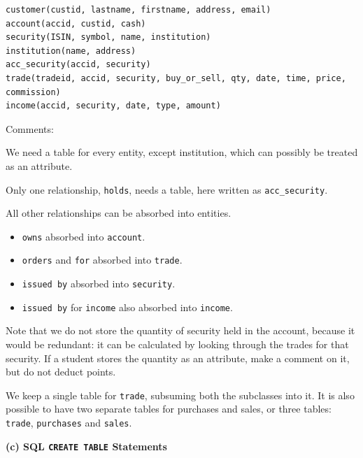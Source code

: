 \begin{verbatim}
customer(custid, lastname, firstname, address, email)
account(accid, custid, cash)
security(ISIN, symbol, name, institution)
institution(name, address)
acc_security(accid, security)
trade(tradeid, accid, security, buy_or_sell, qty, date, time, price, commission)
income(accid, security, date, type, amount)
\end{verbatim}

Comments:

We need a table for every entity, except institution, which can possibly be treated as an attribute.

Only one relationship, \texttt{holds}, needs a table, here written as \texttt{acc\_security}.

All other relationships can be absorbed into entities.
\begin{itemize}
  \item \texttt{owns} absorbed into \texttt{account}.
  \item \texttt{orders} and \texttt{for} absorbed into \texttt{trade}.
  \item \texttt{issued by} absorbed into \texttt{security}.
  \item \texttt{issued by} for \texttt{income} also absorbed into \texttt{income}.
\end{itemize}

Note that we do not store the quantity of security held in the account, because it would be redundant: it can be calculated by looking through the trades for that security. If a student stores the quantity as an attribute, make a comment on it, but do not deduct points.

We keep a single table for \texttt{trade}, subsuming both the subclasses into it. It is also possible to have two separate tables for purchases and sales, or three tables: \texttt{trade}, \texttt{purchases} and \texttt{sales}.

\textbf{(c) SQL \texttt{CREATE TABLE} Statements} \\

